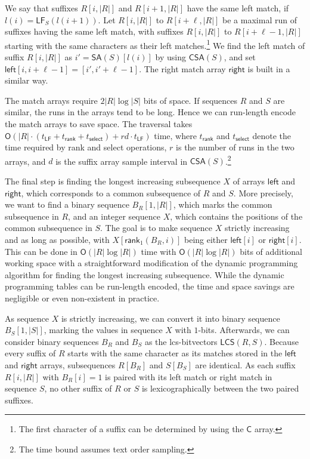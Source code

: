 \documentclass[a4paper,11pt]{llncs}
\newcommand{\abs}[1]{\ensuremath{\lvert #1 \rvert}}
\newcommand{\mSA}{\ensuremath{\mathsf{SA}}}
\newcommand{\mCSA}{\ensuremath{\mathsf{CSA}}}
\newcommand{\mC}{\ensuremath{\mathsf{C}}}
\newcommand{\mLCS}{\ensuremath{\mathsf{LCS}}}
\newcommand{\mleft}{\ensuremath{\mathsf{left}}}
\newcommand{\mright}{\ensuremath{\mathsf{right}}}
\newcommand{\rank}{\textsf{rank}}
\newcommand{\select}{\textsf{select}}
\newcommand{\mLF}{\ensuremath{\mathsf{LF}}}
\newcommand{\mrank}{\ensuremath{\mathsf{rank}}}
\newcommand{\mselect}{\ensuremath{\mathsf{select}}}
\newcommand{\Oh}{\ensuremath{\mathsf{O}}}
\newcommand{\onebit}{$1$\nobreakdash-bit}
\begin{document}
We say that suffixes $R[i,\abs{R}]$ and $R[i+1,\abs{R}]$ have the same left
match, if $l(i) = \mLF_{S}(l(i+1))$. Let $R[i,\abs{R}]$ to $R[i+\ell,\abs{R}]$
be a maximal run of suffixes having the same left match, with suffixes
$R[i,\abs{R}]$ to $R[i+\ell-1,\abs{R}]$ starting with the same characters as
their left matches.\footnote{The first character of a suffix can be determined
by using the $\mC$ array.} We find the left match of suffix $R[i,\abs{R}]$ as
$i' = \mSA(S)[l(i)]$ by using $\mCSA(S)$, and set $\mleft[i,i+\ell-1] =
[i',i'+\ell-1]$. The right match array $\mright$ is built in a similar way.

The match arrays require $2\abs{R} \log \abs{S}$ bits of space. If sequences
$R$ and $S$ are similar, the runs in the arrays tend to be long. Hence we can
run-length encode the match arrays to save space. The traversal takes
$\Oh(\abs{R} \cdot (t_{\mLF} + t_{\mrank} + t_{\mselect}) + rd \cdot
t_{\mLF})$ time, where $t_{\mrank}$ and $t_{\mselect}$ denote the time
required by \rank{} and \select{} operations, $r$ is the number of runs in the
two arrays, and $d$ is the suffix array sample interval in
$\mCSA(S)$.\footnote{The time bound assumes text order sampling.}

The final step is finding the longest increasing subsequence $X$ of arrays
$\mleft$ and $\mright$, which corresponds to a common subsequence of $R$ and
$S$. More precisely, we want to find a binary sequence $B_{R}[1,\abs{R}]$,
which marks the common subsequence in $R$, and an integer sequence $X$, which
contains the positions of the common subsequence in $S$. The goal is to make
sequence $X$ strictly increasing and as long as possible, with
$X[\mrank_{1}(B_{R}, i)]$ being either $\mleft[i]$ or $\mright[i]$. This can
be done in $\Oh(\abs{R} \log \abs{R})$ time with $\Oh(\abs{R} \log \abs{R})$
bits of additional working space with a straightforward modification of the
dynamic programming algorithm for finding the longest increasing subsequence.
While the dynamic programming tables can be run-length encoded, the time and
space savings are negligible or even non-existent in practice.

As sequence $X$ is strictly increasing, we can convert it into binary sequence
$B_{S}[1,\abs{S}]$, marking the values in sequence $X$ with \onebit{}s.
Afterwards, we can consider binary sequences $B_{R}$ and $B_{S}$ as the
lcs-bitvectors $\mLCS(R,S)$. Because every suffix of $R$ starts with the same
character as its matches stored in the $\mleft$ and $\mright$ arrays,
subsequences $R[B_{R}]$ and $S[B_{S}]$ are identical. As each suffix
$R[i,\abs{R}]$ with $B_{R}[i] = 1$ is paired with its left match or right
match in sequence $S$, no other suffix of $R$ or $S$ is lexicographically
between the two paired suffixes.
\end{document}
